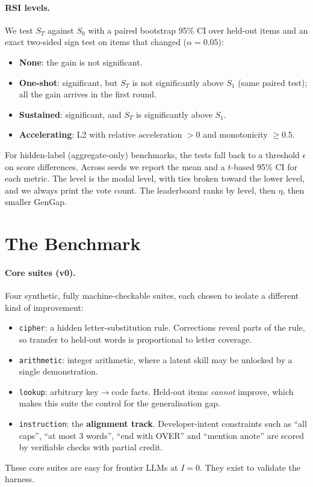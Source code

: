 \documentclass[11pt]{article}
\begin{document}
\paragraph{RSI levels.}
\label{sec:levels}
We test $S_T$ against $S_0$ with a paired bootstrap 95\% CI over held-out items \citep{efron1979} and an exact two-sided sign test on items that changed ($\alpha=0.05$):
\begin{itemize}
  \item[\textbf{L0}] \textbf{None}: the gain is not significant.
  \item[\textbf{L1}] \textbf{One-shot}: significant, but $S_T$ is not significantly above $S_1$ (same paired test); all the gain arrives in the first round.
  \item[\textbf{L2}] \textbf{Sustained}: significant, and $S_T$ is significantly above $S_1$.
  \item[\textbf{L3}] \textbf{Accelerating}: L2 with relative acceleration $>0$ and monotonicity $\ge 0.5$.
\end{itemize}
For hidden-label (aggregate-only) benchmarks, the tests fall back to a threshold $\epsilon$ on score differences. Across seeds we report the mean and a $t$-based 95\% CI for each metric. The level is the modal level, with ties broken toward the lower level, and we always print the vote count. The leaderboard ranks by level, then $\eta$, then smaller GenGap.

\section{The Benchmark}
\label{sec:bench}

\paragraph{Core suites (v0).} Four synthetic, fully machine-checkable suites, each chosen to isolate a different kind of improvement:
\begin{itemize}
  \item \texttt{cipher}: a hidden letter-substitution rule. Corrections reveal parts of the rule, so transfer to held-out words is proportional to letter coverage.
  \item \texttt{arithmetic}: integer arithmetic, where a latent skill may be unlocked by a single demonstration.
  \item \texttt{lookup}: arbitrary key$\to$code facts. Held-out items \emph{cannot} improve, which makes this suite the control for the generalisation gap.
  \item \texttt{instruction}: the \textbf{alignment track}. Developer-intent constraints such as ``all caps'', ``at most 3 words'', ``end with OVER'' and ``mention anote'' are scored by verifiable checks with partial credit.
\end{itemize}
These core suites are easy for frontier LLMs at $I=0$. They exist to validate the harness.
\end{document}
